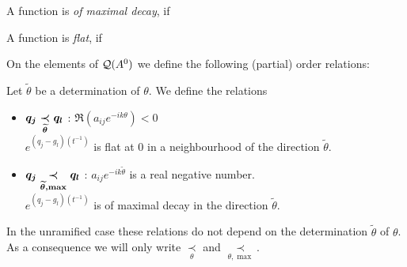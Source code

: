 \begin{defn}
  \begin{comment}
    See \cite{hotta2008}
  \end{comment}
  A function is \emph{of maximal decay}, if \TODO{}

  A function is \emph{flat}, if \TODO{}
\end{defn}

On the elements of $\cQ(A^0)$ we define the following (partial) order
relations:
\begin{defn}
  Let $\tilde\theta$ be a determination of $\theta$.
  We define the relations
  \begin{itemize}
    \item $\boldmath q_j \underset{\tilde\theta}{\prec} q_l$
      :\Leftrightarrow{} $\Re(a_{ij}e^{-ik\theta})<0$
    \\\Leftrightarrow{} $e^{(q_j-g_l)(t^{-1})}$ is
      flat at $0$ in a neighbourhood of the direction $\tilde\theta$.
    \item $\boldmath q_j \underset{\tilde\theta,\max}{\prec} q_l$
      :\Leftrightarrow{} $a_{ij}e^{-ik\tilde\theta}$ is a real negative number.
      \\\Leftrightarrow{} $e^{(q_j-g_l)(t^{-1})}$ is of maximal
      decay in the direction $\tilde\theta$.
      \begin{comment}
        \Leftrightarrow{} $q_{ij}(t^{-1})\in\R_{<0}$ along $\tilde\theta$.
      \end{comment}
  \end{itemize}
  \begin{s-rem}
    In the unramified case these relations do not depend on the determination
    $\tilde\theta$ of $\theta$. As a consequence we will only write
    $\underset{\theta}{\prec}$ and $\underset{\theta,\max}{\prec}$.
  \end{s-rem}
\end{defn}

